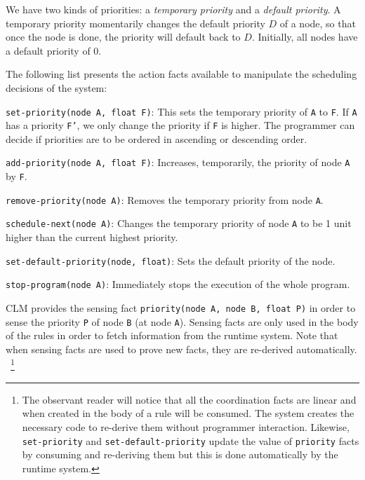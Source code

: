 We have two kinds of priorities: a \emph{temporary priority} and a \emph{default
priority}. A temporary priority momentarily changes the default priority $D$ of a
node, so that once the node is done, the priority will default back to $D$.
Initially, all nodes have a default priority of $0$.

The following list presents the action facts available to manipulate the scheduling
decisions of the system:

\newcommand{\code}[1]{\texttt{\small{#1}}}

\begin{tightitemize}
   \item \code{set-priority(node A, float F)}: This sets the
   temporary priority of \texttt{A} to \texttt{F}. If \texttt{A} has a priority
   \texttt{F'}, we only change the priority if \texttt{F} is higher. The programmer
   can decide if priorities are to be ordered in ascending or descending order.
   \item \code{add-priority(node A, float F)}: Increases,
   temporarily, the priority of node \texttt{A} by \texttt{F}.
   \item \code{remove-priority(node A)}: Removes the temporary priority from node
   \texttt{A}.
   \item \code{schedule-next(node A)}: Changes the temporary priority of node
   \texttt{A} to be 1 unit higher than the current highest priority.
   \item \code{set-default-priority(node, float)}: Sets the default
   priority of the node.
   \item \code{stop-program(node A)}: Immediately stops the
   execution of the whole program.
\end{tightitemize}

CLM provides the sensing fact \code{priority(node A, node B, float P)} in order to sense the
priority \texttt{P} of node \texttt{B} (at node \texttt{A}).
Sensing facts are only used in the body of the rules in order
to fetch information from the runtime system.
Note that when sensing facts are used to prove new facts, they are re-derived automatically.
~\footnote{The observant reader will notice that all the coordination facts are
linear and when created in the body of a rule will be consumed. The system
creates the necessary code to re-derive them without programmer interaction.
Likewise, \texttt{set-priority} and \texttt{set-default-priority} update the
value of \texttt{priority} facts by consuming and re-deriving them but this is
done automatically by the runtime system.}

